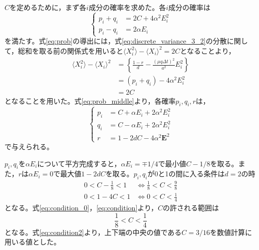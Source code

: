 \documentclass[autodetect-engine,dvi=dvipdfmx,a4paper,ja=standard,oneside,openany,11pt]{bxjsbook}
\begin{document}
$C$を定めるために，まず各$i$成分の確率を求めた。各$i$成分の確率は
\begin{equation}
  \left\{
  \begin{aligned}
    p_i+q_i & =2C+4\alpha^2E_i^2 \\
    p_i-q_i & =2\alpha E_i
  \end{aligned}
  \right.
  \label{eq:prob}
\end{equation}
を満たす。式\eqref{eq:prob}の導出には，式\eqref{eq:discrete_variance_3_2}の分散に関して，総和を取る前の関係式を用いると$\langle X_i^2\rangle-\langle X_i\rangle^2=2C$となることより，
\begin{equation}
  \begin{split}
    \langle X_i^2\rangle-\langle X_i\rangle^2 & =\left\{\frac{1-r}{d}-\frac{(\mu q \Delta t)^2}{a^2}E_i^2\right\} \\
                                              & =(p_i+q_i)-4\alpha^2E_i^2                                         \\
                                              & =2C
  \end{split}
  \label{eq:prob_middle}
\end{equation}
となることを用いた。式\eqref{eq:prob_middle}より，各確率$p_i,q_i,r$は，
\begin{equation}
  \left\{
  \begin{aligned}
    p_i & =C+\alpha E_i+2\alpha^2 E_i^2 \\
    q_i & =C-\alpha E_i+2\alpha^2 E_i^2 \\
    r   & =1-2dC-4\alpha^2\bm{E}^2
  \end{aligned}
  \right.
  \label{eq:prob3}
\end{equation}
で与えられる。

$p_i,q_i$を$\alpha E_i$について平方完成すると，$\alpha E_i=\mp1/4$で最小値$C-1/8$を取る。また，$r$は$\alpha E_i=0$で最大値$1-2dC$を取る。$p_i,q_i$が0と1の間に入る条件は$d=2$の時
\begin{align}
  0<C-\frac{1}{8}<1 & \Leftrightarrow  \frac{1}{8}<C<\frac{9}{8} \label{eq:condition_0} \\
  0<1-4C<1          & \Leftrightarrow  0<C<\frac{1}{4}
  \label{eq:condition}
\end{align}
となる。式\eqref{eq:condition_0}，\eqref{eq:condition}より，$C$の許される範囲は
\begin{equation}
  \frac{1}{8}<C<\frac{1}{4}
  \label{eq:condition2}
\end{equation}
となる。式\eqref{eq:condition2}より，上下端の中央の値である$C=3/16$を数値計算に用いる値とした。
\end{document}
